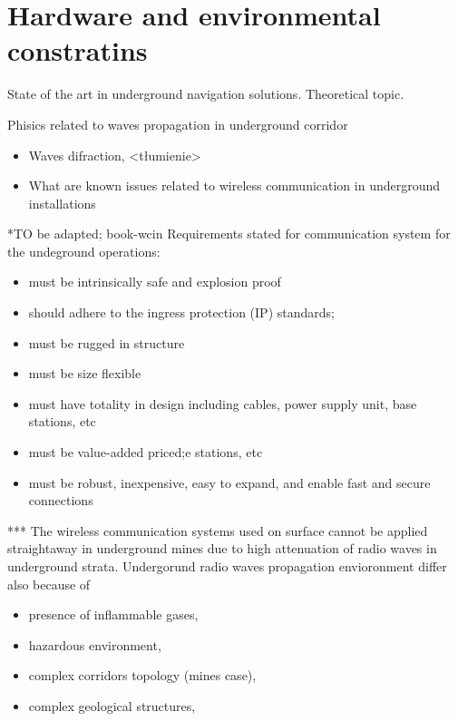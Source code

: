 \documentclass[../main.tex]{subfiles}
\begin{document}
\section{Hardware and environmental constratins} %
\label{sub:hardware_and_environmental_constratins}



State of the art in underground navigation solutions. Theoretical topic.

Phisics related to waves propagation in underground corridor
\begin{itemize}
	\item Waves difraction, <tłumienie>
	\item What are known issues related to wireless communication in underground installations
\end{itemize}



*TO be adapted; book-wcin
Requirements stated for communication system for the undeground operations:
\begin{itemize}
	\item must be intrinsically safe and explosion proof
	\item should adhere to the ingress protection (IP) standards;
	\item must be rugged in structure
	\item must be size flexible
	\item must have totality in design including cables, power supply unit, base stations, etc
	\item must be value-added priced;e stations, etc
	\item must be robust, inexpensive, easy to expand,
and enable fast and secure connections
\end{itemize}



***
The wireless communication systems used on surface cannot be applied straightaway in underground mines due to high attenuation of radio waves in underground strata. Undergorund radio waves propagation envioronment differ also because of
\begin{itemize}
	\item presence of inflammable gases,
	\item hazardous environment,
	\item complex corridors topology (mines case),
	\item complex geological structures,
\end{itemize}
\end{document}
